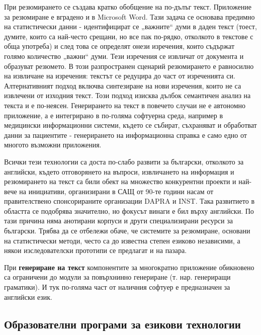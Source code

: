 \documentclass[]{../../metanetpaper}
\begin{document}
\begin{multicols}{2}
При резюмирането се създава кратко обобщение на по-дълъг текст. Приложение за резюмиране е вградено и в Microsoft Word. Тази задача се основава предимно на статистически данни - идентифицират се „важните“ думи в даден текст (тоест, думите, които са най-често срещани, но все
 пак по-рядко, отколкото в текстове с обща употреба) и
 след това се определят онези изречения, които съдържат
 голямо количество „важни“ думи. Тези изречения се извличат от документа и образуват резюмето. В този разпространен сценарий резюмирането е равносилно на извличане на изречения: текстът се редуцира до част от изреченията си.
 Алтернативният подход включва синтезиране на нови
 изречения, които не са извлечени от изходния текст. Този подход изисква дълбок семантичен анализ на текста и е по-неясен. Генерирането на текст в повечето случаи не е автономно приложение, а е интегрирано в по-голяма софтуерна среда, например в медицински информационни системи, където се събират, съхраняват и обработват данни за пациентите - генерирането на информационна справка е само едно от многото възможни приложения.
 

Всички тези технологии са доста по-слабо развити за български, отколкото за английски, където отговорянето на въпроси, извличането на информация
 и резюмирането на текст са били обект на множество конкурентни проекти и най-вече на инициативи, организирани в САЩ от 90-те години насам от правителствено спонсорираните организации DAPRA и INST. Така развитието в областта се подобрява значително, но фокусът винаги е бил върху английски. По тази причина няма анотирани корпуси и други специализирани ресурси за български. Трябва да се отбележи обаче, че системите за резюмиране, основани на статистически методи, често са до известна степен езиково независими, а някои изследователски прототипи се предлагат и на пазара.

При \textbf{генериране на текст} компонентите за многократно приложение обикновено са
 ограничени до модули за повърхнинно генериране (т. нар. генериращи граматики). И тук по-голяма част от наличния софтуер е предназначен за английски език.

\subsection{Образователни програми за езикови технологии}


\end{multicols}
\end{document}
